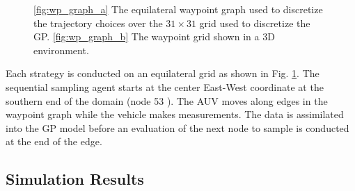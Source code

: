 \begin{figure}[!h] 
\centering 
{}
\hfill
{}
\caption{\ref{fig:wp_graph_a} The equilateral waypoint graph used to discretize the
trajectory choices over the $31\times31$ grid used to discretize the GP.
\ref{fig:wp_graph_b} The waypoint grid shown in a 3D environment.}
\label{fig:wp_graph}
\end{figure}

Each strategy is conducted on an equilateral grid as shown in
Fig. \ref{fig:wp_graph}. The sequential sampling agent starts at the
center East-West coordinate at the southern end of the domain (node 53
). The
AUV moves along edges in the waypoint graph while the vehicle makes
measurements. The data is assimilated into the GP model before an
evaluation of the next node to sample is conducted at the end of the
edge.

\subsection{Simulation Results}

